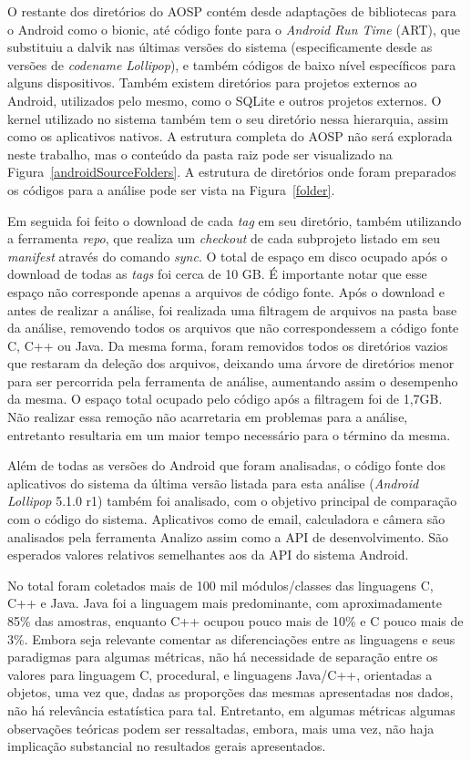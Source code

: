 O restante dos diretórios do AOSP contém desde adaptações de bibliotecas para o Android como o bionic, até código fonte para o \textit{Android Run Time} (ART), que substituiu a dalvik nas últimas versões do sistema (especificamente desde as versões de \textit{codename Lollipop}), e também códigos de baixo nível específicos para alguns dispositivos. Também existem diretórios para projetos externos ao Android, utilizados pelo mesmo, como o SQLite e outros projetos externos. O kernel utilizado no sistema também tem o seu diretório nessa hierarquia, assim como os aplicativos nativos. A estrutura completa do AOSP não será explorada neste trabalho, mas o conteúdo da pasta raiz pode ser visualizado na Figura~\ref{androidSourceFolders}. A estrutura de diretórios onde foram preparados os códigos para a análise pode ser vista na Figura~\ref{folder}.

Em seguida foi feito o download de cada \textit{tag} em seu diretório, também utilizando a ferramenta \textit{repo}, que realiza um \textit{checkout} de cada subprojeto listado em seu \textit{manifest} através do comando \textit{sync}. O total de espaço em disco ocupado após o download de todas as \textit{tags} foi cerca de 10 GB. É importante notar que esse espaço não corresponde apenas a arquivos de código fonte. Após o download e antes de realizar a análise, foi realizada uma filtragem de arquivos na pasta base da análise, removendo todos os arquivos que não correspondessem a código fonte C, C++ ou Java. Da mesma forma, foram removidos todos os diretórios vazios que restaram da deleção dos arquivos, deixando uma árvore de diretórios menor para ser percorrida pela ferramenta de análise, aumentando assim o desempenho da mesma. O espaço total ocupado pelo código após a filtragem foi de 1,7GB. Não realizar essa remoção não acarretaria em problemas para a análise, entretanto resultaria em um maior tempo necessário para o término da mesma.

Além de todas as versões do Android que foram analisadas, o código fonte dos aplicativos do sistema da última versão listada para esta análise (\textit{Android Lollipop} 5.1.0 r1) também foi analisado, com o objetivo principal de comparação com o código do sistema. Aplicativos como de email, calculadora e câmera são analisados pela ferramenta Analizo assim como a API de desenvolvimento. São esperados valores relativos semelhantes aos da API do sistema Android.

No total foram coletados mais de 100 mil módulos/classes das linguagens C, C++ e Java. Java foi a linguagem mais predominante, com aproximadamente 85\% das amostras, enquanto C++ ocupou pouco mais de 10\% e C pouco mais de 3\%. Embora seja relevante comentar as diferenciações entre as linguagens e seus paradigmas para algumas métricas,  não há necessidade de separação entre os valores para linguagem C, procedural, e linguagens Java/C++, orientadas a objetos, uma vez que, dadas as proporções das mesmas apresentadas nos dados, não há relevância estatística para tal. Entretanto, em algumas métricas algumas observações teóricas podem ser ressaltadas, embora, mais uma vez, não haja implicação substancial no resultados gerais apresentados.

